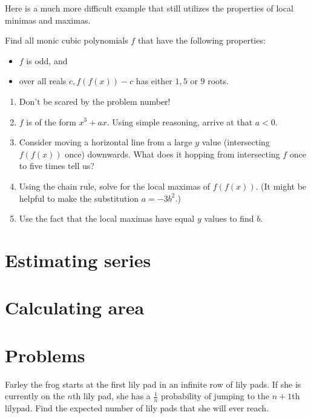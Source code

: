 \documentclass[mast]{lucky}
\begin{document}
Here is a much more difficult example that still utilizes the properties of local minimas and maximas.
\begin{exam}
Find all monic cubic polynomials $f$ that have the following properties:
\begin{itemize}
\item $f$ is odd, and
\item over all reals $c, f(f(x))-c$ has either $1, 5$ or $9$ roots.
\end{itemize}
\end{exam}
\begin{walk}
\begin{enumerate}
\item Don't be scared by the problem number!
\item $f$ is of the form $x^3+ax$. Using simple reasoning, arrive at that $a<0$.
\item Consider moving a horizontal line from a large $y$ value (intersecting $f(f(x))$ once) downwards. What does it hopping from intersecting $f$ once to five times tell us?
\item Using the chain rule, solve for the local maximas of $f(f(x))$. (It might be helpful to make the substitution $a=-3b^2$.)
\item Use the fact that the local maximas have equal $y$ values to find $b$.
\end{enumerate}
\end{walk}
\section{Estimating series}

\section{Calculating area}

\section{Problems}
\noindent{}

\begin{prob}[SMT 2021]{2}
Farley the frog starts at the first lily pad in an infinite row of lily pads. If she is currently on the $n$th lily pad, she has a $\frac{1}{n}$ probability of jumping to the $n+1$th lilypad. Find the expected number of lily pads that she will ever reach.
\end{prob}
\end{document}
